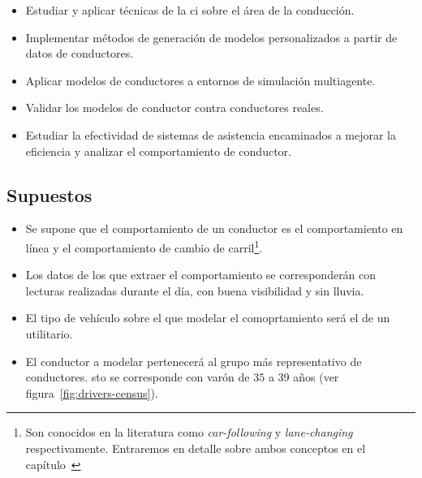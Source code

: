 \begin{itemize}
	\item Estudiar y aplicar técnicas de la \ac{ci} sobre el área de la conducción.
	\item Implementar métodos de generación de modelos personalizados a partir de datos de conductores.
	\item Aplicar modelos de conductores a entornos de simulación multiagente.
	\item Validar los modelos de conductor contra conductores reales.
	\item Estudiar la efectividad de sistemas de asistencia encaminados a mejorar la eficiencia y analizar el comportamiento de conductor.
\end{itemize}

\subsection{Supuestos}

\begin{itemize}
	\item Se supone que el comportamiento de un conductor es el comportamiento en línea y el comportamiento de cambio de carril\footnote{Son conocidos en la literatura como \textit{car-following} y \textit{lane-changing} respectivamente. Entraremos en detalle sobre ambos conceptos en el capítulo~}.
	\item Los datos de los que extraer el comportamiento se corresponderán con lecturas realizadas durante el día, con buena visibilidad y sin lluvia.
	\item El tipo de vehículo sobre el que modelar el comoprtamiento será el de un utilitario.
	\item El conductor a modelar pertenecerá al grupo más representativo de conductores. sto se corresponde con varón de $35$ a $39$ años (ver figura~\ref{fig:drivers-census}).
\end{itemize}


